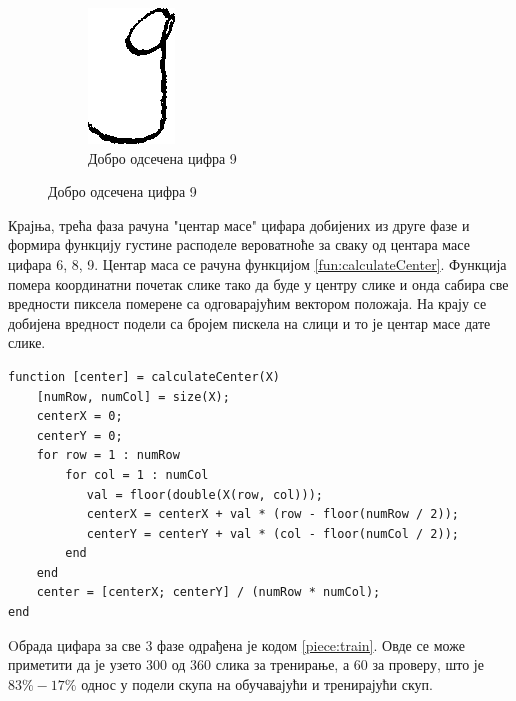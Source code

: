 \begin{figure}[htb!]
\begin{subfigure}{.26\textwidth}
\end{subfigure}
\begin{subfigure}{.3\textwidth}
\centering
\includegraphics[width=.48\linewidth]{pictures/1/GoodCrop9}
\caption{Добро одсечена цифра 9}\label{pic:goodCrop9}
\end{subfigure}
\end{figure}

Крајња, трећа фаза рачуна "центар масе" цифара добијених из друге фазе и формира функцију густине расподеле вероватноће за сваку од центара масе цифара 6, 8, 9. Центар маса се рачуна функцијом \ref{fun:calculateCenter}. Функција помера координатни почетак слике тако да буде у центру слике и онда сабира све вредности пиксела померене са одговарајућим вектором положаја. На крају се добијена вредност подели са бројем пискела на слици и то је центар масе дате слике.

\begin{lstlisting}[caption={Центар масе},label={fun:calculateCenter}]
function [center] = calculateCenter(X)
    [numRow, numCol] = size(X);
    centerX = 0;
    centerY = 0;
    for row = 1 : numRow
        for col = 1 : numCol
           val = floor(double(X(row, col)));
           centerX = centerX + val * (row - floor(numRow / 2));
           centerY = centerY + val * (col - floor(numCol / 2));
        end
    end
    center = [centerX; centerY] / (numRow * numCol);
end
\end{lstlisting}

Oбрада цифара за све 3 фазе одрађена је кодом \ref{piece:train}. Овде се може приметити да је узето 300 од 360 слика за тренирање, а 60 за проверу, што је $83\%-17\% $ однос у подели скупа на обучавајући и тренирајући скуп. 

